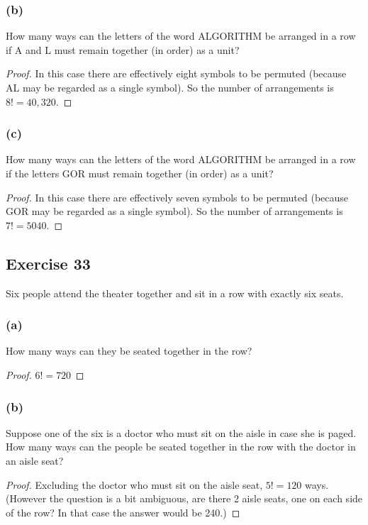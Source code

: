 \documentclass[14pt]{extarticle}
\begin{document}
\subsubsection{(b)}
How many ways can the letters of the word ALGORITHM be arranged in a row if A and L must remain together (in 
order) as a unit?

\begin{proof}
In this case there are effectively eight symbols to be permuted (because AL may be regarded as a single symbol). 
So the number of arrangements is \(8! = 40,320\).
\end{proof}

\subsubsection{(c)}
How many ways can the letters of the word ALGORITHM be arranged in a row if the letters GOR must remain together 
(in order) as a unit?

\begin{proof}
In this case there are effectively seven symbols to be permuted (because GOR may be regarded as a single symbol). 
So the number of arrangements is \(7! = 5040\).
\end{proof}

\subsection{Exercise 33}
Six people attend the theater together and sit in a row with exactly six seats.

\subsubsection{(a)}
How many ways can they be seated together in the row?

\begin{proof}
\(6! = 720\)
\end{proof}

\subsubsection{(b)}
Suppose one of the six is a doctor who must sit on the aisle in case she is paged. How many ways can the people be 
seated together in the row with the doctor in an aisle seat?

\begin{proof}
Excluding the doctor who must sit on the aisle seat, \(5! = 120\) ways. (However the question is a bit ambiguous, are 
there 2 aisle seats, one on each side of the row? In that case the answer would be 240.)
\end{proof}
\end{document}
